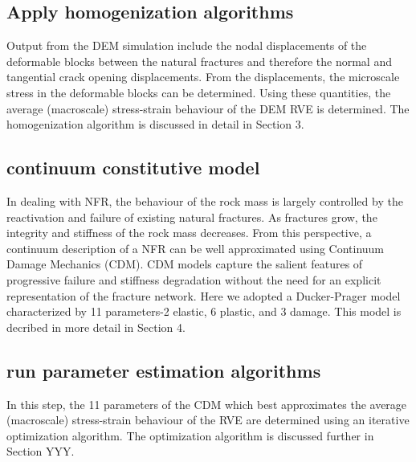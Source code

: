 \subsection*{Apply homogenization algorithms}
Output from the DEM simulation include the nodal displacements of the deformable blocks between the natural fractures and therefore the normal and tangential crack opening displacements. From the displacements, the microscale stress in the deformable blocks can be determined.  Using these quantities, the average (macroscale) stress-strain behaviour of the DEM RVE is determined. The homogenization algorithm is discussed in detail in Section 3.

\subsection*{continuum constitutive model}
In dealing with NFR, the behaviour of the rock mass is largely controlled by the reactivation and failure of existing natural fractures. As fractures grow, the integrity and stiffness of the rock mass decreases. From this perspective, a continuum description of a NFR can be well approximated using Continuum Damage Mechanics (CDM). CDM models capture the salient features of progressive failure and stiffness degradation without the need for an explicit representation of the fracture network. Here we adopted a Ducker-Prager model characterized by 11 parameters-2 elastic, 6 plastic, and 3 damage. This model is decribed in more detail in Section 4.

\subsection*{run parameter estimation algorithms}
In this step, the 11 parameters of the CDM which best approximates the average (macroscale) stress-strain behaviour of the RVE are determined using an iterative optimization algorithm. The optimization algorithm is discussed further in Section YYY.

